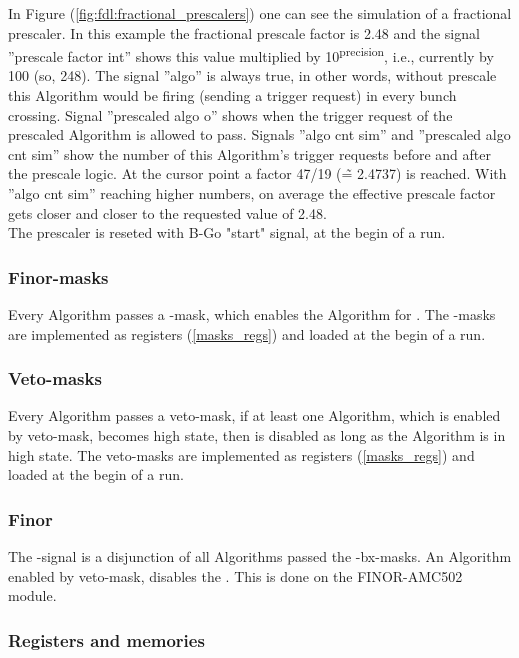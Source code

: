 In Figure (\ref{fig:fdl:fractional_prescalers}) one can see the simulation of a fractional prescaler. In this example the fractional prescale factor is 2.48 and the signal 
”prescale factor int” shows this value multiplied by 10\textsuperscript{\tiny{precision}}, i.e., currently by 100 (so, 248).
The signal ”algo” is always true, in other words, without prescale this Algorithm would be firing (sending a trigger request) in every bunch crossing. Signal ”prescaled algo o” shows when the trigger request of the prescaled Algorithm is allowed to pass. Signals ”algo cnt sim” and ”prescaled algo cnt sim” show the number of this Algorithm’s trigger requests before and after the prescale logic. At the cursor point a factor 47/19 (\~{=} 2.4737) is reached. With ”algo cnt sim” reaching higher numbers, on average the effective prescale factor gets closer and closer to the requested value of 2.48.\\
The prescaler is reseted with B-Go "start" signal, at the begin of a run.

\subsubsection{Finor-masks}
\label{sec:fdl:finor_masks}

Every Algorithm passes a \finor-mask, which enables the Algorithm for \finor.
The \finor-masks are implemented as registers (\ref{masks_regs}) and loaded at the begin of a run.

\subsubsection{Veto-masks}
\label{sec:fdl:veto_masks}

Every Algorithm passes a veto-mask, if at least one Algorithm, which is enabled by veto-mask, becomes high state, then \finor is disabled as long as the Algorithm is in high state.
The veto-masks are implemented as registers (\ref{masks_regs}) and loaded at the begin of a run.

\subsubsection{Finor}
\label{sec:fdl:finor}

The \finor-signal is a disjunction of all Algorithms passed the \finor-bx-masks. An Algorithm enabled by veto-mask, disables the \finor. This is done on the FINOR-AMC502 module.

\clearpage
\subsubsection{Registers and memories}
\label{sec:fdl:reg_mem}

